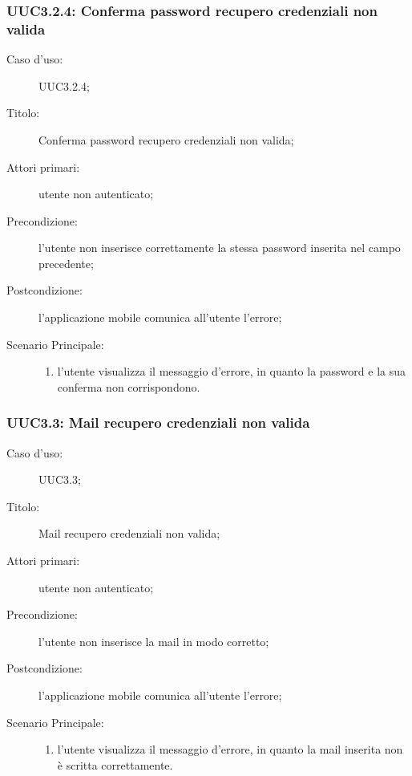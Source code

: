\documentclass[../../../analisi-dei-requisiti.tex]{subfiles}
\begin{document}
\subsubsection{UUC3.2.4: Conferma password recupero credenziali non valida}%
\label{subs:UUC3.2.4}
\begin{description}
  \item[Caso d’uso:] UUC3.2.4;
  \item[Titolo:] Conferma password recupero credenziali non valida;
  \item[Attori primari:] utente non autenticato;
  \item[Precondizione:] l'utente non inserisce correttamente la stessa password inserita nel campo precedente;
  \item[Postcondizione:] l'applicazione mobile comunica all'utente l'errore;
  \item[Scenario Principale:]
        \begin{enumerate}
          \item l'utente visualizza il messaggio d'errore, in quanto la password e la sua conferma non corrispondono.
        \end{enumerate}
\end{description}

\subsubsection{UUC3.3: Mail recupero credenziali non valida}%
\label{subs:UUC3.3}

\begin{description}
  \item[Caso d’uso:] UUC3.3;
  \item[Titolo:] Mail recupero credenziali non valida;
  \item[Attori primari:] utente non autenticato;
  \item[Precondizione:] l'utente non inserisce la mail in modo corretto;
  \item[Postcondizione:] l'applicazione mobile comunica all'utente l'errore;
  \item[Scenario Principale:]
        \begin{enumerate}
          \item l'utente visualizza il messaggio d'errore, in quanto la mail inserita non è scritta correttamente.
        \end{enumerate}
\end{description}
\end{document}
